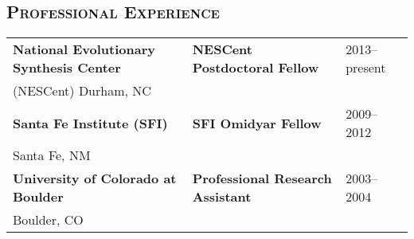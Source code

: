 \documentclass[centered,overlapped,line]{res}
\begin{document}
\begin{resume}
  \section{\bf \large \scshape Professional Experience}
  \vspace{1ex}
  \begin{tabular}{@{}p{2.5in}@{}p{2in}l}
    \bfseries National Evolutionary Synthesis Center & \textbf{NESCent Postdoctoral Fellow} & 2013--present \\
    \hspace{0.5in} (NESCent) Durham, NC & & \\[2ex]

    \bfseries Santa Fe Institute (SFI) & \textbf{SFI Omidyar Fellow} & 2009--2012 \\
    \hspace{0.5in} Santa Fe, NM &  & \\[2ex]

    \bfseries University of Colorado at Boulder & \textbf{Professional Research Assistant} & 2003--2004 \\
    \hspace{0.5in} Boulder, CO & &
  \end{tabular}




\end{resume}
\end{document}
